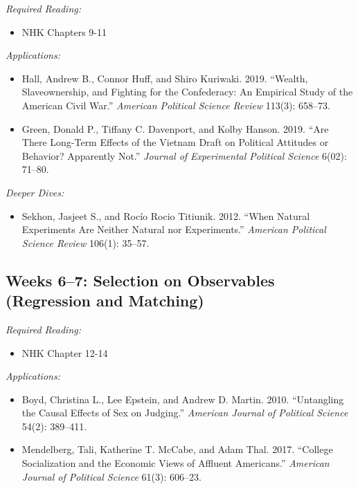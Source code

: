 \documentclass[11pt, letterpaper]{article}
\begin{document}
\textit{Required Reading:}

\begin{itemize}
	\item NHK Chapters 9-11

\end{itemize}

\noindent \textit{Applications:}

\begin{itemize}
	\item Hall, Andrew B., Connor Huff, and Shiro Kuriwaki. 2019. ``Wealth, Slaveownership, and Fighting for the Confederacy: An Empirical Study of the American Civil War.'' \textit{American Political Science Review} 113(3): 658–73.
	\item Green, Donald P., Tiffany C. Davenport, and Kolby Hanson. 2019. ``Are There Long-Term Effects of the Vietnam Draft on Political Attitudes or Behavior? Apparently Not.'' \textit{Journal of Experimental Political Science} 6(02): 71–80.
\end{itemize}

\noindent \textit{Deeper Dives:}

\begin{itemize}
	\item Sekhon, Jasjeet S., and Rocío Rocio Titiunik. 2012. ``When Natural Experiments Are Neither Natural nor Experiments.'' \textit{American Political Science Review} 106(1): 35–57.
\end{itemize}

\subsection*{Weeks 6--7: Selection on Observables (Regression and Matching)}

\textit{Required Reading:}

\begin{itemize}
	\item NHK Chapter 12-14
\end{itemize}

\noindent \textit{Applications:}

\begin{itemize}
	\item Boyd, Christina L., Lee Epstein, and Andrew D. Martin. 2010. ``Untangling the Causal Effects of Sex on Judging.'' \textit{American Journal of Political Science} 54(2): 389–411.
	\item Mendelberg, Tali, Katherine T. McCabe, and Adam Thal. 2017. ``College Socialization and the Economic Views of Affluent Americans.'' \textit{American Journal of Political Science} 61(3): 606–23.
\end{itemize}
\end{document}
